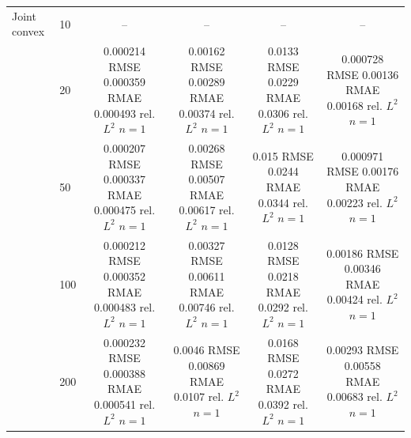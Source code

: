 \begin{tabular}{llcccc}
\addlinespace
Joint convex & 10 & -- & -- & -- & -- \\
 & 20 & \shortstack{0.000214 RMSE\\0.000359 RMAE\\0.000493 rel. $L^2$\\$n=1$} & \shortstack{0.00162 RMSE\\0.00289 RMAE\\0.00374 rel. $L^2$\\$n=1$} & \shortstack{0.0133 RMSE\\0.0229 RMAE\\0.0306 rel. $L^2$\\$n=1$} & \shortstack{0.000728 RMSE\\0.00136 RMAE\\0.00168 rel. $L^2$\\$n=1$} \\
 & 50 & \shortstack{0.000207 RMSE\\0.000337 RMAE\\0.000475 rel. $L^2$\\$n=1$} & \shortstack{0.00268 RMSE\\0.00507 RMAE\\0.00617 rel. $L^2$\\$n=1$} & \shortstack{0.015 RMSE\\0.0244 RMAE\\0.0344 rel. $L^2$\\$n=1$} & \shortstack{0.000971 RMSE\\0.00176 RMAE\\0.00223 rel. $L^2$\\$n=1$} \\
 & 100 & \shortstack{0.000212 RMSE\\0.000352 RMAE\\0.000483 rel. $L^2$\\$n=1$} & \shortstack{0.00327 RMSE\\0.00611 RMAE\\0.00746 rel. $L^2$\\$n=1$} & \shortstack{0.0128 RMSE\\0.0218 RMAE\\0.0292 rel. $L^2$\\$n=1$} & \shortstack{0.00186 RMSE\\0.00346 RMAE\\0.00424 rel. $L^2$\\$n=1$} \\
 & 200 & \shortstack{0.000232 RMSE\\0.000388 RMAE\\0.000541 rel. $L^2$\\$n=1$} & \shortstack{0.0046 RMSE\\0.00869 RMAE\\0.0107 rel. $L^2$\\$n=1$} & \shortstack{0.0168 RMSE\\0.0272 RMAE\\0.0392 rel. $L^2$\\$n=1$} & \shortstack{0.00293 RMSE\\0.00558 RMAE\\0.00683 rel. $L^2$\\$n=1$} \\

\end{tabular}
